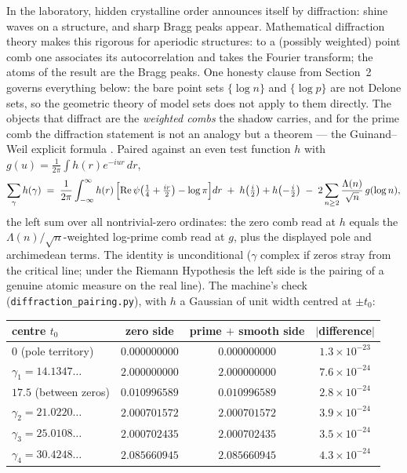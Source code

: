 \documentclass[11pt]{article}
\theoremstyle{remark}
\begin{document}
In the laboratory, hidden crystalline order announces itself by diffraction: shine waves on a
structure, and sharp Bragg peaks appear. Mathematical diffraction theory \cite{Hof, BaakeGrimm}
makes this rigorous for aperiodic structures: to a (possibly weighted) point comb one associates
its autocorrelation and takes the Fourier transform; the atoms of the result are the Bragg peaks.
One honesty clause from Section~2 governs everything below: the bare point sets $\{\log n\}$ and
$\{\log p\}$ are not Delone sets, so the geometric theory of model sets does not apply to them
directly. The objects that diffract are the \emph{weighted combs} the shadow carries, and for the
prime comb the diffraction statement is not an analogy but a theorem --- the Guinand--Weil
explicit formula \cite{Guinand, Weil52}. Paired against an even test function $h$ with
$g(u) = \frac{1}{2\pi}\int h(r)e^{-iur}\,dr$,
\[
\sum_{\gamma} h(\gamma) \;=\; \frac{1}{2\pi}\int_{-\infty}^{\infty} h(r)\,
\Bigl[\mathrm{Re}\,\psi\bigl(\tfrac14 + \tfrac{ir}{2}\bigr) - \log\pi\Bigr]dr
\;+\; h\bigl(\tfrac{i}{2}\bigr) + h\bigl(-\tfrac{i}{2}\bigr)
\;-\; 2\sum_{n \ge 2} \frac{\Lambda(n)}{\sqrt n}\, g(\log n),
\]
the left sum over all nontrivial-zero ordinates: the zero comb read at $h$ equals the
$\Lambda(n)/\sqrt n$-weighted log-prime comb read at $g$, plus the displayed pole and archimedean
terms. The identity is unconditional ($\gamma$ complex if zeros stray from the critical line;
under the Riemann Hypothesis the left side is the pairing of a genuine atomic measure on the real
line). The machine's check (\texttt{diffraction\_pairing.py}), with $h$ a Gaussian of unit width
centred at $\pm t_0$:

\begin{center}
\begin{tabular}{lccc}
\hline
centre $t_0$ & zero side & prime $+$ smooth side & $|$difference$|$ \\
\hline
$0$ (pole territory) & $0.000000000$ & $0.000000000$ & $1.3 \times 10^{-23}$ \\
$\gamma_1 = 14.1347\ldots$ & $2.000000000$ & $2.000000000$ & $7.6 \times 10^{-24}$ \\
$17.5$ (between zeros) & $0.010996589$ & $0.010996589$ & $2.8 \times 10^{-24}$ \\
$\gamma_2 = 21.0220\ldots$ & $2.000701572$ & $2.000701572$ & $3.9 \times 10^{-24}$ \\
$\gamma_3 = 25.0108\ldots$ & $2.000702435$ & $2.000702435$ & $3.5 \times 10^{-24}$ \\
$\gamma_4 = 30.4248\ldots$ & $2.085660945$ & $2.085660945$ & $4.3 \times 10^{-24}$ \\
\hline
\end{tabular}
\end{center}
\end{document}
